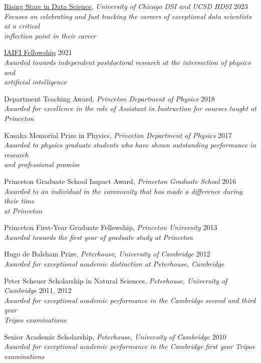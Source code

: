 \documentclass[letterpaper,11pt]{article}
\newenvironment{packed_itemize}{
\begin{itemize}[label=\raisebox{0.25ex}{\tiny$\bullet$}]
  \setlength{\itemsep}{4.2pt}
  \setlength{\parskip}{0pt}
  \setlength{\parsep}{0pt}}{\end{itemize}
}
\begin{document}
\begin{packed_itemize}
  \item \href{https://datascience.uchicago.edu/research/postdoctoral-programs/rising-stars-in-data-science-2/2023-rising-stars/}{Rising Stars in Data Science}, \emph{University of Chicago DSI and UCSD HDSI} \hfill 2023 \\ \emph{Focuses on celebrating and fast tracking the careers of exceptional data scientists at a critical \\ inflection point in their career}
  \item \href{https://iaifi.org/current-fellows.html}{IAIFI Fellowship} \hfill 2021 \\ \emph{Awarded towards independent postdoctoral research at the intersection of physics and \\ artificial intelligence}
  \item Department Teaching Award, \emph{Princeton Department of Physics}  \hfill 2018 \\ \emph{Awarded for excellence in the role of Assistant in Instruction for courses taught at Princeton}
  \item Kusaka Memorial Prize in Physics, \emph{Princeton Department of Physics} \hfill 2017 \\ \emph{Awarded to physics graduate students who have shown outstanding performance in research \\ and professional promise}
  \item Princeton Graduate School Impact Award, \emph{Princeton Graduate School} \hfill 2016 \\ \emph{Awarded to an individual in the community that has made a difference during their time \\ at Princeton}
  \item Princeton First-Year Graduate Fellowship, \emph{Princeton University} \hfill 2013 \\ \emph{Awarded towards the first year of graduate study at Princeton}
  \item Hugo de Balsham Prize, \emph{Peterhouse, University of Cambridge}  \hfill 2012 \\ \emph{Awarded for exceptional academic distinction at Peterhouse, Cambridge}
  \item Peter Scheuer Scholarship in Natural Sciences, \emph{Peterhouse, University of Cambridge} \hfill 2011, 2012 \\ \emph{Awarded for exceptional academic performance in the Cambridge second and third year \\ Tripos examinations}
  \item Senior Academic Scholarship, \emph{Peterhouse, University of Cambridge} \hfill 2010\\ \emph{Awarded for exceptional academic performance in the Cambridge first year Tripos examinations}
\end{packed_itemize}
\vspace{2.0mm}
\end{document}
